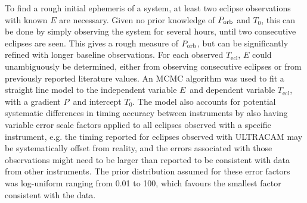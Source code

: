 To find a rough initial ephemeris of a system, at least two eclipse observations with known $E$ are necessary. Given no prior knowledge of $P_{\rm orb}$ and $T_0$, this can be done by simply observing the system for several hours, until two consecutive eclipses are seen. This gives a rough measure of $P_{\rm orb}$, but can be significantly refined with longer baseline observations. 
For each observed $T_\mathrm{ecl}$, $E$ could unambiguously be determined, either from observing consecutive eclipses or from previously reported literature values.
An MCMC algorithm was used to fit a straight line model to the independent variable $E$\ and dependent variable $T_\mathrm{ecl}$, with a gradient $P$\ and intercept $T_0$. 
The model also accounts for potential systematic differences in timing accuracy between instruments by also having variable error scale factors applied to all eclipses observed with a specific instrument, e.g. the timing reported for eclipses observed with ULTRACAM may be systematically offset from reality, and the errors associated with those observations might need to be larger than reported to be consistent with data from other instruments. The prior distribution assumed for these error factors was log-uniform ranging from 0.01 to 100, which favours the smallest factor consistent with the data. 

